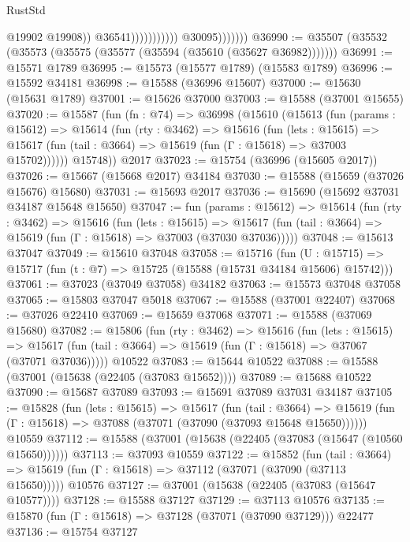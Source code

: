 \begin{lexlean}{RustStd}
\begin{coremodule}
                                            @19902
                                            @19908))
                                        @36541)))))))))))
                  @30095)))))))
@36990 := @35507 (@35532 (@35573 (@35575 (@35577 (@35594 (@35610 (@35627 @36982)))))))
@36991 := @15571 @1789
@36995 := @15573 (@15577 @1789) (@15583 @1789)
@36996 := @15592 @34181
@36998 := @15588 (@36996 @15607)
@37000 := @15630 (@15631 @1789)
@37001 := @15626 @37000
@37003 := @15588 (@37001 @15655)
@37020 := @15587
    (fun (fn : @74) =>
    @36998
      (@15610
        (@15613
          (fun (params : @15612) =>
          @15614
            (fun (rty : @3462) =>
            @15616
              (fun (lets : @15615) =>
              @15617 (fun (tail : @3664) => @15619 (fun (Γ : @15618) => @37003 @15702))))))
        @15748))
    @2017
@37023 := @15754 (@36996 (@15605 @2017))
@37026 := @15667 (@15668 @2017) @34184
@37030 := @15588 (@15659 (@37026 @15676) @15680)
@37031 := @15693 @2017
@37036 := @15690 (@15692 @37031 @34187 @15648 @15650)
@37047 := fun (params : @15612) =>
  @15614
    (fun (rty : @3462) =>
    @15616
      (fun (lets : @15615) =>
      @15617 (fun (tail : @3664) => @15619 (fun (Γ : @15618) => @37003 (@37030 @37036)))))
@37048 := @15613 @37047
@37049 := @15610 @37048
@37058 := @15716
    (fun (U : @15715) => @15717 (fun (t : @7) => @15725 (@15588 (@15731 @34184 @15606) @15742)))
@37061 := @37023 (@37049 @37058) @34182
@37063 := @15573 @37048 @37058
@37065 := @15803 @37047 @5018
@37067 := @15588 (@37001 @22407)
@37068 := @37026 @22410
@37069 := @15659 @37068
@37071 := @15588 (@37069 @15680)
@37082 := @15806
    (fun (rty : @3462) =>
    @15616
      (fun (lets : @15615) =>
      @15617 (fun (tail : @3664) => @15619 (fun (Γ : @15618) => @37067 (@37071 @37036)))))
    @10522
@37083 := @15644 @10522
@37088 := @15588 (@37001 (@15638 (@22405 (@37083 @15652))))
@37089 := @15688 @10522
@37090 := @15687 @37089
@37093 := @15691 @37089 @37031 @34187
@37105 := @15828
    (fun (lets : @15615) =>
    @15617
      (fun (tail : @3664) =>
      @15619 (fun (Γ : @15618) => @37088 (@37071 (@37090 (@37093 @15648 @15650))))))
    @10559
@37112 := @15588 (@37001 (@15638 (@22405 (@37083 (@15647 (@10560 @15650))))))
@37113 := @37093 @10559
@37122 := @15852
    (fun (tail : @3664) => @15619 (fun (Γ : @15618) => @37112 (@37071 (@37090 (@37113 @15650)))))
    @10576
@37127 := @37001 (@15638 (@22405 (@37083 (@15647 @10577))))
@37128 := @15588 @37127
@37129 := @37113 @10576
@37135 := @15870 (fun (Γ : @15618) => @37128 (@37071 (@37090 @37129))) @22477
@37136 := @15754 @37127

\end{coremodule}
\end{lexlean}
